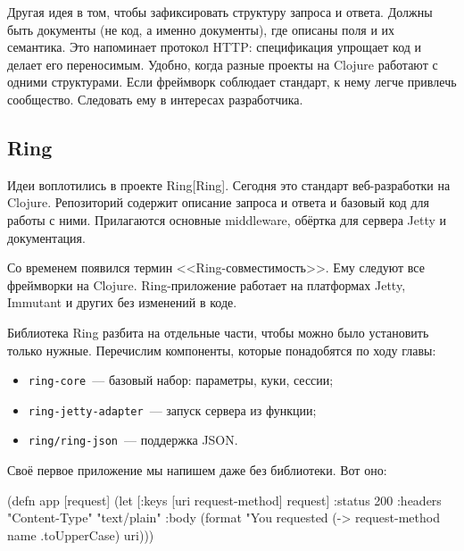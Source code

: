 Другая идея в том, чтобы зафиксировать структуру запроса и ответа. Должны быть
документы (не код, а именно документы), где описаны поля и их семантика. Это
напоминает протокол HTTP: спецификация упрощает код и делает его
переносимым. Удобно, когда разные проекты на Clojure работают с одними
структурами. Если фреймворк соблюдает стандарт, к нему легче привлечь
сообщество. Следовать ему в интересах разработчика.

\subsection{Ring}

\label{ring-jetty}

Идеи воплотились в проекте Ring[Ring].
Сегодня это стандарт веб-разработки на Clojure. Репозиторий содержит описание
запроса и ответа и базовый код для работы с ними. Прилагаются основные middleware,
обёртка для сервера Jetty и документация.


Со временем появился термин <<Ring-совместимость>>. Ему следуют все фреймворки
на Clojure. Ring-приложение работает на платформах Jetty, Immutant и других без
изменений в коде.

Библиотека Ring разбита на отдельные части, чтобы можно было установить только
нужные. Перечислим компоненты, которые понадобятся по ходу главы:

\begin{itemize}

\item
  \verb|ring-core|~--- базовый набор: параметры, куки, сессии;

\item
  \verb|ring-jetty-adapter|~--- запуск сервера из функции;

\item
  \verb|ring/ring-json|~--- поддержка JSON.

\end{itemize}

Своё первое приложение мы напишем даже без библиотеки. Вот оно:


\label{first-handler}

\begin{english}
  \begin{clojure}
(defn app [request]
  (let [{:keys [uri request-method]} request]
    {:status 200
     :headers {"Content-Type" "text/plain"}
     :body (format "You requested %
                   (-> request-method name .toUpperCase)
                   uri)}))
  \end{clojure}
\end{english}


